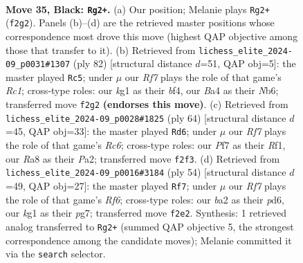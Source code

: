 \documentclass[11pt]{article}
\begin{document}
\clearpage

\begin{figure}[p]\centering
\begin{subfigure}{0.46\textwidth}\centering
\resizebox{\linewidth}{!}{%
\newchessgame
\chessboard[
  setfen={r7/pp3p2/5k2/7p/bP2P3/P5Pp/B4r2/R1R3K1 b - - 1 35},
  showmover=false,
  pgfstyle=straightmove, color=movearrow, markmove={f2-g2}
]}
\caption{}
\end{subfigure}\hfill
\begin{subfigure}{0.46\textwidth}\centering
\resizebox{\linewidth}{!}{%
\newchessgame
\chessboard[
  setfen={8/8/1N1kr1p1/p6p/3Prb2/1P1K3P/6P1/R1R5 w - - 1 42},
  showmover=false,
  pgfstyle=straightmove, color=movearrow, markmove={c1-c5}
]}
\caption{}
\end{subfigure}
\\[4pt]
\begin{subfigure}{0.46\textwidth}\centering
\resizebox{\linewidth}{!}{%
\newchessgame
\chessboard[
  setfen={4r3/pk2r3/1pR1b2p/8/1B2P2P/2P3p1/P1P3P1/2K2R2 w - - 1 33},
  showmover=false,
  pgfstyle=straightmove, color=movearrow, markmove={c6-d6}
]}
\caption{}
\end{subfigure}\hfill
\begin{subfigure}{0.46\textwidth}\centering
\resizebox{\linewidth}{!}{%
\newchessgame
\chessboard[
  setfen={4r2k/ppp3pP/3p1RP1/8/8/8/PPP1r3/2K4R w - - 1 28},
  showmover=false,
  pgfstyle=straightmove, color=movearrow, markmove={f6-f7}
]}
\caption{}
\end{subfigure}
\caption{\textbf{Move 35, Black: \texttt{Rg2+}.} (a) Our position; Melanie plays \texttt{Rg2+} (\texttt{f2g2}). Panels (b)--(d) are the retrieved master positions whose correspondence most drove this move (highest QAP objective among those that transfer to it). (b) Retrieved from \texttt{lichess\_elite\_2024-09\_p0031\#1307} (ply 82) [structural distance $d$=51, QAP obj=5]: the master played \texttt{Rc5}; under $\mu$ our \emph{Rf7} plays the role of that game's \emph{Rc1}; cross-type roles: our \emph{k}g1 as their \emph{b}f4, our \emph{B}a4 as their \emph{N}b6; transferred move \texttt{f2g2} \textbf{(endorses this move)}. (c) Retrieved from \texttt{lichess\_elite\_2024-09\_p0028\#1825} (ply 64) [structural distance $d$=45, QAP obj=33]: the master played \texttt{Rd6}; under $\mu$ our \emph{Rf7} plays the role of that game's \emph{Rc6}; cross-type roles: our \emph{P}f7 as their \emph{R}f1, our \emph{R}a8 as their \emph{P}a2; transferred move \texttt{f2f3}. (d) Retrieved from \texttt{lichess\_elite\_2024-09\_p0016\#3184} (ply 54) [structural distance $d$=49, QAP obj=27]: the master played \texttt{Rf7}; under $\mu$ our \emph{Rf7} plays the role of that game's \emph{Rf6}; cross-type roles: our \emph{b}a2 as their \emph{p}d6, our \emph{k}g1 as their \emph{p}g7; transferred move \texttt{f2e2}. Synthesis: 1 retrieved analog transferred to \texttt{Rg2+} (summed QAP objective 5, the strongest correspondence among the candidate moves); Melanie committed it via the \texttt{search} selector.}
\label{fig:thought-m69}
\end{figure}
\end{document}
